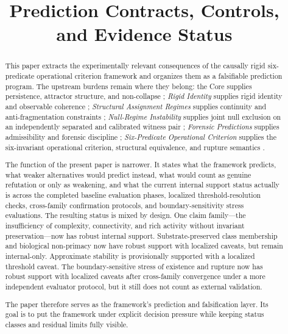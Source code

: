 \documentclass[11pt,a4paper]{article}
\title{\textbf{Prediction Contracts, Controls, and Evidence Status}}
\author{\AuthorVisible}
\date{}
\begin{document}
\setlength{\emergencystretch}{3em}
\maketitle

\begin{abstract}
This paper extracts the experimentally relevant consequences of the causally rigid six-predicate operational criterion framework and organizes them as a falsifiable prediction program. The upstream burdens remain where they belong: the Core supplies persistence, attractor structure, and non-collapse \cite{core}; \textit{Rigid Identity} supplies rigid identity and observable coherence \cite{paper1}; \textit{Structural Assignment Regimes} supplies continuity and anti-fragmentation constraints \cite{paper2}; \textit{Null-Regime Instability} supplies joint null exclusion on an independently separated and calibrated witness pair \cite{paper3}; \textit{Forensic Predictions} supplies admissibility and forensic discipline \cite{paper4}; \textit{Six-Predicate Operational Criterion} supplies the six-invariant operational criterion, structural equivalence, and rupture semantics \cite{paper5}.

The function of the present paper is narrower. It states what the framework predicts, what weaker alternatives would predict instead, what would count as genuine refutation or only as weakening, and what the current internal support status actually is across the completed baseline evaluation phases, localized threshold-resolution checks, cross-family confirmation protocols, and boundary-sensitivity stress evaluations. The resulting status is mixed by design. One claim family---the insufficiency of complexity, connectivity, and rich activity without invariant preservation---now has robust internal support. Substrate-preserved class membership and biological non-primacy now have robust support with localized caveats, but remain internal-only. Approximate stability is provisionally supported with a localized threshold caveat. The boundary-sensitive stress of existence and rupture now has robust support with localized caveats after cross-family convergence under a more independent evaluator protocol, but it still does not count as external validation.

The paper therefore serves as the framework's prediction and falsification layer. Its goal is to put the framework under explicit decision pressure while keeping status classes and residual limits fully visible.
\end{abstract}
\end{document}
